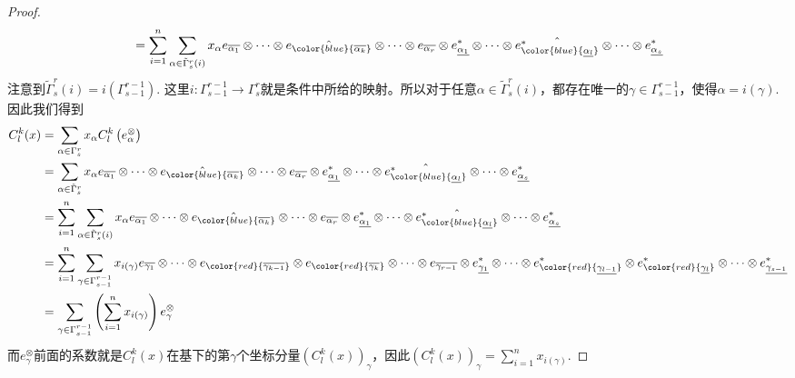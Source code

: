 \begin{proof}
\[\begin{split}
	&=\sum_{ i = 1 }^{n}\sum_{ \alpha\in \tilde{  \Gamma  }^{r}_{s}(i) }x_{\alpha}e_{\overline{\alpha_{ 1 }}}\otimes \cdots\otimes \hat{e_{\color{blue}{\overline{\alpha_{ k }}}}}\otimes \cdots\otimes e_{\overline{\alpha_{ r }}}\otimes e^{\ast}_{\underline{\alpha_{ 1 }}}\otimes\cdots\otimes \hat{e^{\ast}_{\color{blue}{\underline{\alpha_{ l }}}}}\otimes\cdots\otimes  e^{\ast}_{\underline{\alpha_{ s }}}\\
	\end{split}
	\]
	注意到$\tilde{  \Gamma  }^{r}_{s}(i)=i(  \Gamma  ^{r-1}_{s-1})$. 这里$i:\Gamma^{r-1}_{s-1}\longrightarrow \Gamma^{r}_{s}$就是条件中所给的映射。所以对于任意$\alpha\in\tilde{  \Gamma  }^{r}_{s}(i) $，都存在唯一的$\gamma\in\Gamma  ^{r-1}_{s-1} $，使得$\alpha=i(\gamma)$. 因此我们得到
	\[
	\begin{split}
	C^{k}_{l}(x)&=\sum_{ \alpha\in \Gamma^{r}_{s} }x_{\alpha}C^{k}_{l}\left(e^{\otimes}_{\alpha}\right)\\
	&=\sum_{ \alpha\in \tilde{  \Gamma  }^{r}_{s} }x_{\alpha}e_{\overline{\alpha_{ 1 }}}\otimes \cdots\otimes \hat{e_{\color{blue}{\overline{\alpha_{ k }}}}}\otimes \cdots\otimes e_{\overline{\alpha_{ r }}}\otimes e^{\ast}_{\underline{\alpha_{ 1 }}}\otimes\cdots\otimes \hat{e^{\ast}_{\color{blue}{\underline{\alpha_{ l }}}}}\otimes\cdots\otimes  e^{\ast}_{\underline{\alpha_{ s }}}\\
	&=\sum_{ i = 1 }^{n}\sum_{ \alpha\in \tilde{  \Gamma  }^{r}_{s}(i) }x_{\alpha}e_{\overline{\alpha_{ 1 }}}\otimes \cdots\otimes \hat{e_{\color{blue}{\overline{\alpha_{ k }}}}}\otimes \cdots\otimes e_{\overline{\alpha_{ r }}}\otimes e^{\ast}_{\underline{\alpha_{ 1 }}}\otimes\cdots\otimes \hat{e^{\ast}_{\color{blue}{\underline{\alpha_{ l }}}}}\otimes\cdots\otimes  e^{\ast}_{\underline{\alpha_{ s }}}\\
	&=\sum_{ i = 1 }^{n}\sum_{ \gamma\in \Gamma^{r-1}_{s-1} }x_{i(\gamma)}e_{\overline{\gamma_{ 1 }}}\otimes \cdots\otimes e_{\color{red}{\overline{\gamma_{ k-1 }}}}\otimes e_{\color{red}{\overline{\gamma_{ k }}}}\otimes \cdots\otimes e_{\overline{\gamma_{ r-1 }}}\otimes e^{\ast}_{\underline{\gamma_{ 1 }}}\otimes\cdots\otimes e^{\ast}_{\color{red}{\underline{\gamma_{ l-1 }}}}\otimes e^{\ast}_{\color{red}{\underline{\gamma_{ l }}}}\otimes\cdots\otimes  e^{\ast}_{\underline{\gamma_{ s-1 }}}\\
	&=\sum_{ \gamma\in \Gamma^{r-1}_{s-1} }\left(\sum_{ i = 1 }^{n}x_{i(\gamma)}\right)e^{\otimes}_{\gamma}\\
	\end{split}
	\]
	而$e^{\otimes}_{\gamma}$前面的系数就是$C^{k}_{l}(x)$在基下的第$\gamma$个坐标分量$\left(C^{k}_{l}(x)\right)_{\gamma}$，因此$\left(C^{k}_{l}(x)\right)_{\gamma}=\sum_{ i = 1 }^{n}x_{i(\gamma)}$.
\end{proof}

